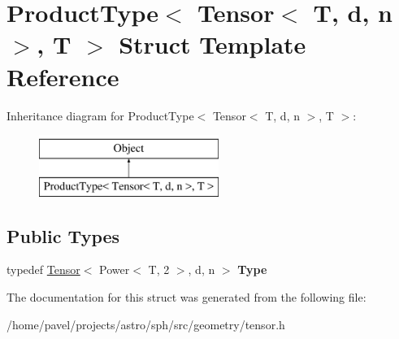 \hypertarget{structProductType_3_01Tensor_3_01T_00_01d_00_01n_01_4_00_01T_01_4}{}\section{Product\+Type$<$ Tensor$<$ T, d, n $>$, T $>$ Struct Template Reference}
\label{structProductType_3_01Tensor_3_01T_00_01d_00_01n_01_4_00_01T_01_4}
Inheritance diagram for Product\+Type$<$ Tensor$<$ T, d, n $>$, T $>$\+:\begin{figure}[H]
\begin{center}
\leavevmode
\includegraphics[height=2.000000cm]{structProductType_3_01Tensor_3_01T_00_01d_00_01n_01_4_00_01T_01_4}
\end{center}
\end{figure}
\subsection*{Public Types}
\begin{DoxyCompactItemize}
\item 
\hypertarget{structProductType_3_01Tensor_3_01T_00_01d_00_01n_01_4_00_01T_01_4_a614209c00ebd4e05a05ead069d88b802}{}\label{structProductType_3_01Tensor_3_01T_00_01d_00_01n_01_4_00_01T_01_4_a614209c00ebd4e05a05ead069d88b802} 
typedef \hyperlink{classTensor}{Tensor}$<$ Power$<$ T, 2 $>$, d, n $>$ {\bfseries Type}
\end{DoxyCompactItemize}


The documentation for this struct was generated from the following file\+:\begin{DoxyCompactItemize}
\item 
/home/pavel/projects/astro/sph/src/geometry/tensor.\+h\end{DoxyCompactItemize}
